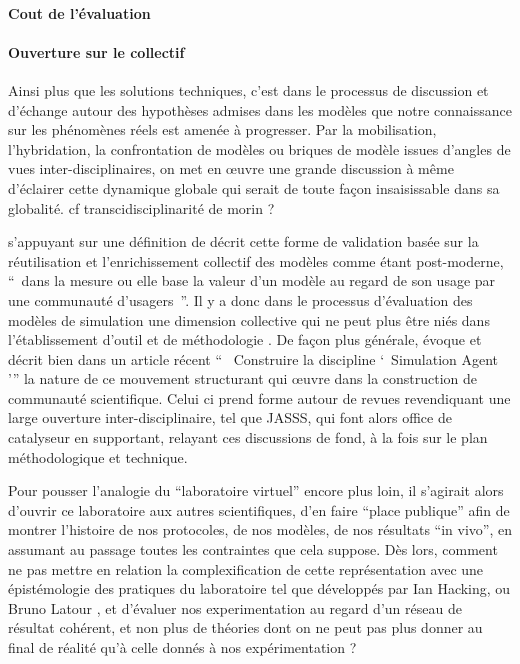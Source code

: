 

\paragraph{Cout de l'évaluation}


\paragraph{Ouverture sur le collectif}

Ainsi plus que les solutions techniques, c'est dans le processus de discussion et d'échange autour des hypothèses admises dans les modèles que notre connaissance sur les phénomènes réels est amenée à progresser. Par la mobilisation, l'hybridation, la confrontation de modèles ou briques de modèle issues d'angles de vues inter-disciplinaires,  on met en œuvre une grande discussion à même d'éclairer cette dynamique globale qui serait de toute façon insaisissable dans sa globalité. {cf transcidisciplinarité de morin ?}

\autocite{Rouchier2013} s'appuyant sur une définition de  décrit cette forme de validation basée sur la réutilisation et l'enrichissement collectif des modèles comme étant post-moderne, \enquote{ dans la mesure ou elle base la valeur d'un modèle au regard de son usage par une communauté d'usagers }. Il y a donc dans le processus d'évaluation des modèles de simulation une dimension collective qui ne peut plus être niés dans l'établissement d'outil et de méthodologie . De façon plus générale, \autocite{Rouchier2013} évoque et décrit bien dans un article récent \enquote{  Construire la discipline \enquote{ Simulation Agent }} la nature de ce mouvement structurant qui œuvre dans la construction de communauté scientifique. Celui ci prend forme autour de revues revendiquant une large ouverture inter-disciplinaire, tel que JASSS, qui font alors office de catalyseur en supportant, relayant ces discussions de fond, à la fois sur le plan méthodologique et technique.

Pour pousser l'analogie du \enquote{laboratoire virtuel} encore plus loin, il s'agirait alors d'ouvrir ce laboratoire aux autres scientifiques, d'en faire \enquote{place publique} afin de montrer l'histoire de nos protocoles, de nos modèles, de nos résultats \foreignquote{latin}{in vivo}, en assumant au passage toutes les contraintes que cela suppose. Dès lors, comment ne pas mettre en relation la complexification de cette représentation avec une épistémologie des pratiques du laboratoire tel que développés par Ian Hacking, ou Bruno Latour , et d'évaluer nos experimentation au regard d'un réseau de résultat cohérent, et non plus de théories dont on ne peut pas plus donner au final de réalité qu'à celle donnés à nos expérimentation ? 


